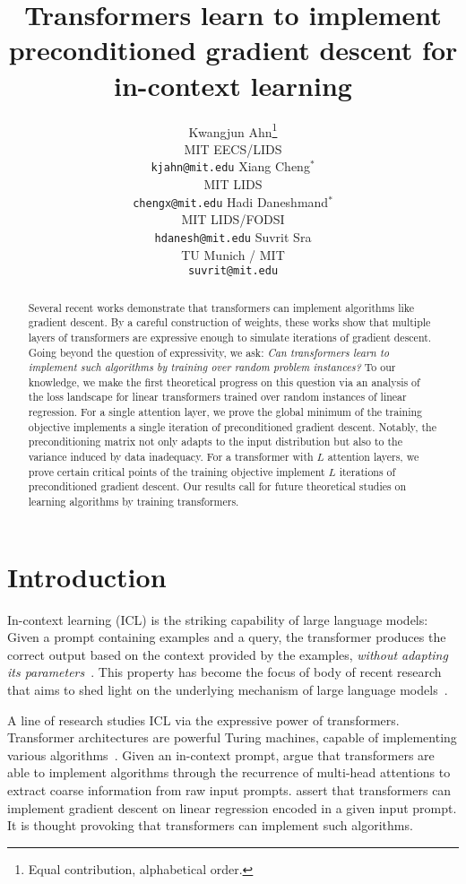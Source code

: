 \documentclass{article}
\title{Transformers learn to implement preconditioned gradient descent for in-context learning}
\author{ Kwangjun Ahn\thanks{Equal contribution, alphabetical order.}\\
MIT EECS/LIDS\\  
\texttt{kjahn@mit.edu} 
\And
Xiang Cheng$^*$\\
MIT LIDS\\  
\texttt{chengx@mit.edu} 
\And
Hadi Daneshmand$^*$\\
MIT LIDS/FODSI\\  
\texttt{hdanesh@mit.edu} 
\And
Suvrit Sra\\
TU Munich / MIT\\  
\texttt{suvrit@mit.edu} 
}
\begin{document}
\maketitle

\begin{abstract}   
Several recent works demonstrate that transformers can implement algorithms like gradient descent. By a careful construction of weights, these works show that multiple layers of transformers are expressive enough to simulate iterations of gradient descent. Going beyond the question of expressivity, we ask: \emph{Can transformers learn to implement such algorithms by training over random problem instances?} To our knowledge, we make the first theoretical progress on this question via an analysis of the loss landscape for linear transformers trained over random instances of linear regression. For a single attention layer, we prove the global minimum of the training objective implements a single iteration of preconditioned gradient descent. Notably, the preconditioning matrix not only adapts to the input distribution but also to the variance induced by data inadequacy.  For a transformer with $L$ attention layers, we prove certain critical points of the training objective implement $L$ iterations of preconditioned gradient descent. Our results call for future theoretical studies on learning algorithms by training transformers. 
\end{abstract} 

\section{Introduction} 
In-context learning (ICL) is the striking capability of large language models: Given a prompt containing examples and a query, the transformer produces the correct output based on the context provided by the examples, \emph{without adapting its parameters}~\citep{brown2020language,lieber2021jurassic, rae2021scaling, black2022gpt}. This property has become the focus of body of recent research that aims to shed light on the underlying mechanism of large language models~\citep{garg2022can,akyurek2022learning,von2022transformers,li2016learning,min2021metaicl,xie2021explanation,elhage2021mathematical,olsson2022context}.

A line of research studies ICL via the expressive power of transformers. Transformer architectures are powerful  Turing machines,  capable of implementing various algorithms~\citep{perez2021attention,wei2022statistically}. Given an in-context prompt,    
\cite{edelman2022inductive,olsson2022context} argue that transformers are able to implement algorithms through the recurrence of multi-head attentions to extract coarse information from raw input prompts. \citet{akyurek2022learning,von2022transformers} assert that transformers can implement gradient descent on linear regression encoded in a given input prompt. It is thought provoking that transformers can implement such algorithms.
\end{document}
